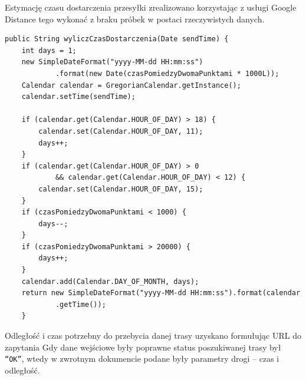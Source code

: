 \documentclass[eng,printmode,oneside]{mgr}
\begin{document}
Estymację czasu dostarczenia przesyłki zrealizowano
korzystając z usługi Google Distance 
 tego wykonać z braku  próbek w postaci rzeczywistych danych. 

\begin{lstlisting}[caption=Metoda
wyliczCzasDostarczenia() z
klasy DistanceMatrix,label=lst:wyliczCzasDostarczenia.DistanceMatrix.java]
public String wyliczCzasDostarczenia(Date sendTime) { 
	int days = 1;
	new SimpleDateFormat("yyyy-MM-dd HH:mm:ss")
			.format(new Date(czasPomiedzyDwomaPunktami * 1000L));
	Calendar calendar = GregorianCalendar.getInstance();
	calendar.setTime(sendTime);
	
	if (calendar.get(Calendar.HOUR_OF_DAY) > 18) {
		calendar.set(Calendar.HOUR_OF_DAY, 11);
		days++;
	}
	if (calendar.get(Calendar.HOUR_OF_DAY) > 0
			&& calendar.get(Calendar.HOUR_OF_DAY) < 12) {
		calendar.set(Calendar.HOUR_OF_DAY, 15);
	}
	if (czasPomiedzyDwomaPunktami < 1000) {
		days--;
	}
	if (czasPomiedzyDwomaPunktami > 20000) {
		days++;
	}
	calendar.add(Calendar.DAY_OF_MONTH, days);
	return new SimpleDateFormat("yyyy-MM-dd HH:mm:ss").format(calendar
			.getTime());
	}
\end{lstlisting}

Odległość i czas potrzebny do przebycia danej trasy uzyskano
formułując URL do zapytania  Gdy dane
wejściowe były poprawne status poszukiwanej trasy był \texttt{``OK''}, wtedy w zwrotnym
dokumencie podane były parametry drogi -- czas i odległość.
\end{document}

